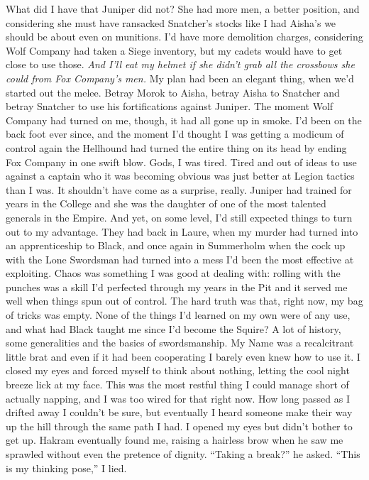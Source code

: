 \documentclass[12pt, openany]{book}
\begin{document}
What did I have that Juniper did not? She had more men, a better position, and considering she must have ransacked Snatcher’s stocks like I had Aisha’s we should be about even on munitions. I’d have more demolition charges, considering Wolf Company had taken a Siege inventory, but my cadets would have to get close to use those. \textit{And I’ll eat my helmet if she didn’t grab all the crossbows she could from Fox Company’s men.} My plan had been an elegant thing, when we’d started out the melee. Betray Morok to Aisha, betray Aisha to Snatcher and betray Snatcher to use his fortifications against Juniper. The moment Wolf Company had turned on me, though, it had all gone up in smoke. I’d been on the back foot ever since, and the moment I’d thought I was getting a modicum of control again the Hellhound had turned the entire thing on its head by ending Fox Company in one swift blow.
Gods, I was tired. Tired and out of ideas to use against a captain who it was becoming obvious was just better at Legion tactics than I was. It shouldn’t have come as a surprise, really. Juniper had trained for years in the College and she was the daughter of one of the most talented generals in the Empire. And yet, on some level, I’d still expected things to turn out to my advantage. They had back in Laure, when my murder had turned into an apprenticeship to Black, and once again in Summerholm when the cock up with the Lone Swordsman had turned into a mess I’d been the most effective at exploiting. Chaos was something I was good at dealing with: rolling with the punches was a skill I’d perfected through my years in the Pit and it served me well when things spun out of control.
The hard truth was that, right now, my bag of tricks was empty. None of the things I’d learned on my own were of any use, and what had Black taught me since I’d become the Squire? A lot of history, some generalities and the basics of swordsmanship. My Name was a recalcitrant little brat and even if it had been cooperating I barely even knew how to use it. I closed my eyes and forced myself to think about nothing, letting the cool night breeze lick at my face. This was the most restful thing I could manage short of actually napping, and I was too wired for that right now. How long passed as I drifted away I couldn’t be sure, but eventually I heard someone make their way up the hill through the same path I had. I opened my eyes but didn’t bother to get up. Hakram eventually found me, raising a hairless brow when he saw me sprawled without even the pretence of dignity.
“Taking a break?” he asked.
“This is my thinking pose,” I lied.
\end{document}

